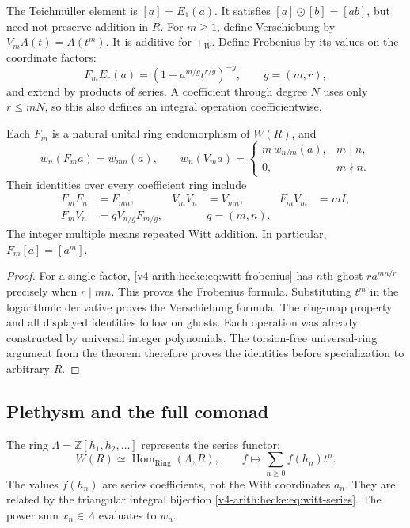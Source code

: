 The Teichm\"uller element is $[a]=E_1(a)$.
It satisfies $[a]\odot[b]=[ab]$, but need not preserve addition in $R$.
For $m\geq1$, define Verschiebung by $V_mA(t)=A(t^m)$.
It is additive for $+_W$.
Define Frobenius by its values on the coordinate factors:
\begin{equation}
 \label{v4-arith:hecke:eq:witt-frobenius}
 F_mE_r(a)=
 \left(1-a^{m/g}t^{r/g}\right)^{-g},
 \qquad g=(m,r),
\end{equation}
and extend by products of series.
A coefficient through degree $N$ uses only $r\leq mN$,
so this also defines an integral operation coefficientwise.

\begin{proposition}
\label{v4-arith:hecke:prop:fv}
Each $F_m$ is a natural unital ring endomorphism of $W(R)$, and
\[
 w_n(F_ma)=w_{mn}(a),\qquad
 w_n(V_ma)=
 \begin{cases}m\,w_{n/m}(a),&m\mid n,\\0,&m\nmid n.\end{cases}
\]
Their identities over every coefficient ring include
\begin{align*}
 F_mF_n&=F_{mn},& V_mV_n&=V_{mn},& F_mV_m&=mI,\\
 F_mV_n&=gV_{n/g}F_{m/g},&&g=(m,n).
\end{align*}
The integer multiple means repeated Witt addition.
In particular, $F_m[a]=[a^m]$.
\end{proposition}
\begin{proof}
For a single factor, \eqref{v4-arith:hecke:eq:witt-frobenius}
has $n$th ghost $r a^{mn/r}$ precisely when $r\mid mn$.
This proves the Frobenius formula.
Substituting $t^m$ in the logarithmic derivative proves the Verschiebung formula.
The ring-map property and all displayed identities follow on ghosts.
Each operation was already constructed by universal integer polynomials.
The torsion-free universal-ring argument from the theorem therefore
proves the identities before specialization to arbitrary $R$.
\end{proof}

\subsection{Plethysm and the full comonad}

The ring $\Lambda=\mathbb Z[h_1,h_2,\ldots]$ represents the series functor:
\[
 W(R)\simeq\operatorname{Hom}_{\mathrm{Ring}}(\Lambda,R),\qquad
 f\longmapsto\sum_{n\geq0}f(h_n)t^n.
\]
The values $f(h_n)$ are series coefficients, not the Witt coordinates $a_n$.
They are related by the triangular integral bijection
\eqref{v4-arith:hecke:eq:witt-series}.
The power sum $x_n\in\Lambda$ evaluates to $w_n$.

